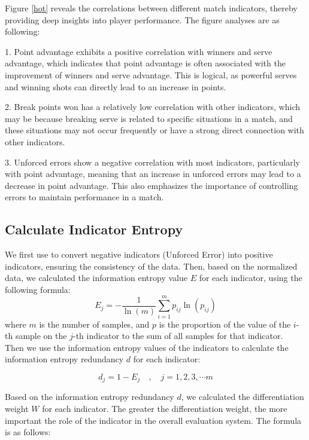 \documentclass[12pt]{article}%
\begin{document}
Figure \ref{hot} reveals the correlations between different match indicators, thereby providing deep insights into player performance. The figure analyses are as following:

1. Point advantage exhibits a positive correlation with winners and serve advantage, which indicates that point advantage is often associated with the improvement of winners and serve advantage. This is logical, as powerful serves and winning shots can directly lead to an increase in points.

2. Break points won has a relatively low correlation with other indicators, which may be because breaking serve is related to specific situations in a match, and these situations may not occur frequently or have a strong direct connection with other indicators.

3. Unforced errors show a negative correlation with most indicators, particularly with point advantage, meaning that an increase in unforced errors may lead to a decrease in point advantage. This also emphasizes the importance of controlling errors to maintain performance in a match.
	
\subsection{Calculate Indicator Entropy} 

We first use to convert negative indicators (Unforced Error) into positive indicators, ensuring the consistency of the data. Then, based on the normalized data, we calculated the information entropy value $E$ for each indicator, using the following formula:
\begin{equation}
E_j=-\frac{1}{\ln (m)} \sum_{i=1}^m p_{i j} \ln \left(p_{i j}\right)
\end{equation}
where \( m \) is the number of samples, and \( p \) is the proportion of the value of the \( i \)-th sample on the \( j \)-th indicator to the sum of all samples for that indicator.\\

Then we use the information entropy values of the indicators to calculate the information entropy redundancy \( d \) for each indicator:

\begin{equation}
	d_j=1-E_j \quad, \quad j=1, 2, 3, \cdots m
\end{equation}
	
Based on the information entropy redundancy \( d \), we calculated the differentiation weight \( W \) for each indicator. The greater the differentiation weight, the more important the role of the indicator in the overall evaluation system. The formula is as follows:
\end{document}
